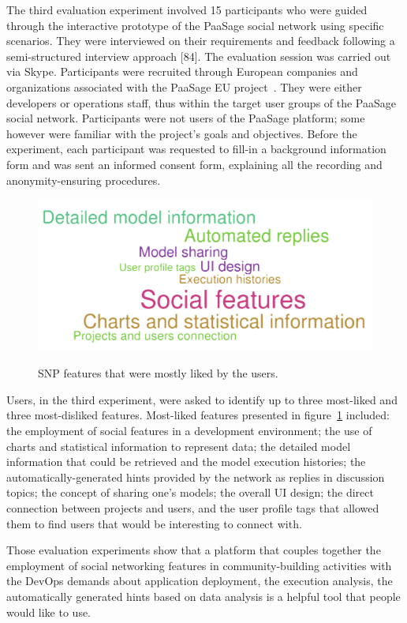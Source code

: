 The third evaluation experiment involved 15 participants who were guided through the interactive prototype of the PaaSage social network using specific scenarios. They were interviewed on their requirements and feedback following a semi-structured interview approach [84]. The evaluation session was carried out via Skype. Participants were recruited through European companies and organizations associated with the PaaSage EU project~\cite{paasage}. They were either developers or operations staff, thus within the target user groups of the PaaSage social network. Participants were not users of the PaaSage platform; some however were familiar with the project’s goals and objectives. Before the experiment, each participant was requested to fill-in a background information form and was sent an informed consent form, explaining all the recording and anonymity-ensuring procedures. 

\begin{figure}[h]
	\caption{SNP features that were mostly liked by the users.}
	\includegraphics[width=1\textwidth,natwidth=200,natheight=150]{./fig/most-liked.pdf}
	\centering
	\label{fig:most-liked}
\end{figure}

Users, in the third experiment, were asked to identify up to three most-liked and three most-disliked features. Most-liked features presented in figure~\ref{fig:most-liked} included: the employment of social features in a development environment; the use of charts and statistical information to represent data; the detailed model information that could be retrieved and the model execution histories; the automatically-generated hints provided by the network as replies in discussion topics; the concept of sharing one’s models; the overall UI design; the direct connection between projects and users, and the user profile tags that allowed them to find users that would be interesting to connect with.

Those evaluation experiments show that a platform that couples together the employment of social networking features in community-building activities with the DevOps demands about application deployment, the execution analysis, the automatically generated hints based on data analysis is a helpful tool that people would like to use.